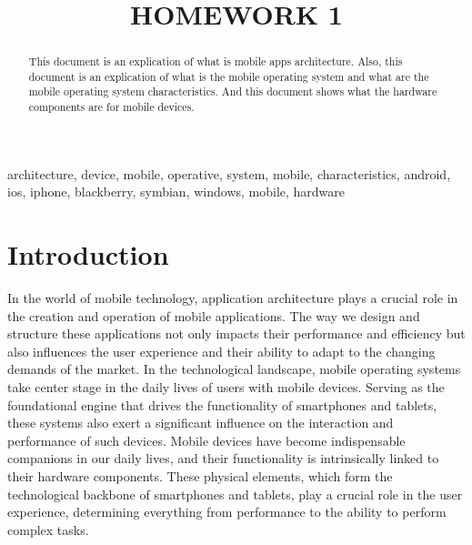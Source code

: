 \documentclass[conference]{IEEEtran}
\begin{document}
\title{HOMEWORK 1\\
}

\author{
}

\maketitle

\begin{abstract}
This document is an explication of what is mobile apps architecture. Also, this document is an explication of what is the mobile operating system and what are the mobile operating system characteristics. And this document shows what the hardware components are for mobile devices.
\end{abstract}

\begin{IEEEkeywords}
architecture, device, mobile, operative, system, mobile, characteristics, android, ios, iphone, blackberry, symbian, windows, mobile, hardware
\end{IEEEkeywords}

\section{Introduction}
In the world of mobile technology, application architecture plays a crucial role in the creation and operation of mobile applications. The way we design and structure these applications not only impacts their performance and efficiency but also influences the user experience and their ability to adapt to the changing demands of the market.
In the technological landscape, mobile operating systems take center stage in the daily lives of users with mobile devices. Serving as the foundational engine that drives the functionality of smartphones and tablets, these systems also exert a significant influence on the interaction and performance of such devices.
Mobile devices have become indispensable companions in our daily lives, and their functionality is intrinsically linked to their hardware components. These physical elements, which form the technological backbone of smartphones and tablets, play a crucial role in the user experience, determining everything from performance to the ability to perform complex tasks.
\end{document}
